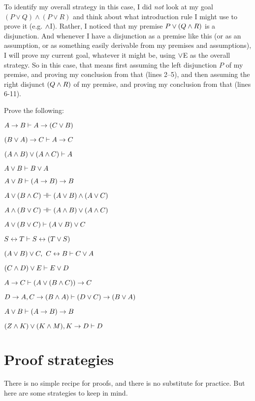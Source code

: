 To identify my overall strategy in this case, I did \emph{not} look at my goal $(P\lor Q)\land (P\lor R)$ and think about what introduction rule I might use to prove it (e.g. $\wedge$I).  Rather, I noticed that my premise $P \vee (Q \wedge R)$ is a disjunction.  And whenever I have a disjunction as a premise like this (or as an assumption, or as something easily derivable from my premises and assumptions), I will prove my current goal, whatever it might be, using $\vee$E as the overall strategy. So in this case, that means first assuming the left disjunction $P$ of my premise, and proving my conclusion from that (lines 2--5), and then assuming the right disjunct $(Q \wedge R)$ of my premise, and proving my conclusion from that (lines 6-11).



\practiceproblems

\problempart
Prove the following:

\begin{earg}
\item $A \rightarrow B \vdash A \rightarrow (C \vee B)$
\item $(B \vee A) \rightarrow C \vdash A \rightarrow C$
\item $(A \wedge B) \vee (A \wedge C) \vdash A$
\item $A \vee B \vdash B \vee A$
\item  $A \vee B \vdash (A\rightarrow B) \rightarrow B$ 
\item $A \eor (B \eand C) \pequiv (A \eor B) \eand (A \eor C)$
\item $ A \eand (B \eor C) \pequiv (A \eand B) \eor (A \eand C)$
\item $A \vee (B \vee C) \vdash (A \vee B) \vee C$
\item $S\leftrightarrow T \vdash S\leftrightarrow (T\vee S)$
\item $(A \vee B) \vee C, \ C \leftrightarrow B \vdash C \vee A$
\item $(C\wedge D)\vee E \vdash E\vee D$
\item $A \rightarrow  C \vdash (A \vee (B \wedge C)) \rightarrow C$ 
\item $D \rightarrow A, C \rightarrow (B \wedge A) \vdash (D \vee C) \rightarrow (B \vee A)$
\item $A \vee B \vdash (A \rightarrow B) \rightarrow B$
\item $(Z\wedge K) \vee (K\wedge M), K \rightarrow D \vdash D$
\end{earg}



\section{Proof strategies}\label{s:ProofStrategies}
There is no simple recipe for proofs, and there is no substitute for practice. But here are some strategies to keep in mind.

